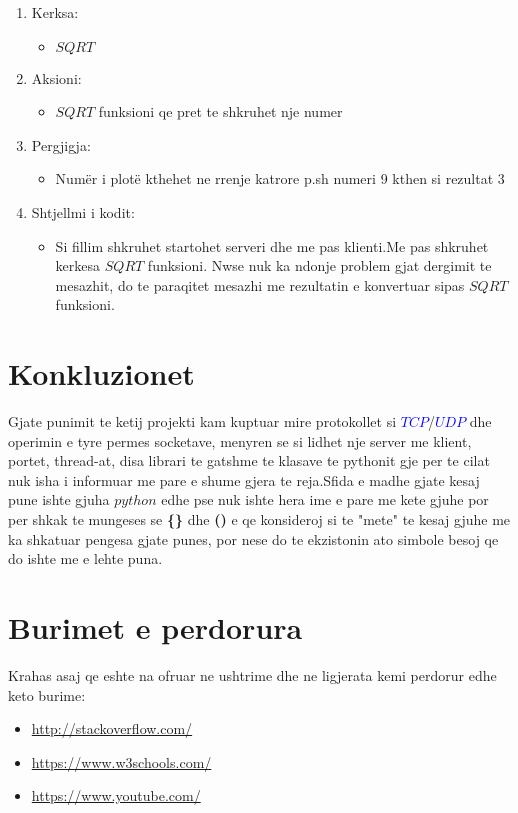 \documentclass[]{article}
\begin{document}
\begin{enumerate}
\item Kerksa:

\begin{itemize}
\item $SQRT$
\end{itemize}
\item Aksioni:
\begin{itemize}
\item $SQRT$ funksioni qe pret te shkruhet nje numer
\end{itemize}
\item Pergjigja:
\begin{itemize}
\item Numër i plotë kthehet ne rrenje katrore p.sh numeri 9 kthen si
rezultat 3
\end{itemize}
\item Shtjellmi i kodit:
\begin{itemize}
\item Si fillim shkruhet startohet serveri dhe me pas klienti.Me pas
shkruhet kerkesa $SQRT$ funksioni. Nwse nuk ka ndonje
problem gjat dergimit te mesazhit,  do te paraqitet
mesazhi me rezultatin e konvertuar sipas $SQRT$ funksioni.
\end{itemize}
\end{enumerate}
\newpage
\section{Konkluzionet}
Gjate punimit te  ketij projekti kam kuptuar mire protokollet si \textcolor{blue}{$TCP$}/\textcolor{blue}{$UDP$} dhe operimin e tyre permes socketave, menyren se si lidhet nje server me klient, portet, thread-at, disa librari te gatshme te klasave te pythonit gje per te cilat nuk isha i informuar me pare e shume gjera te reja.Sfida e madhe gjate kesaj pune ishte gjuha $python$ edhe pse nuk ishte hera ime e pare me kete gjuhe por per shkak te mungeses se \textbf{\{\}} dhe \textbf{()} e qe konsideroj si te "mete"  te kesaj gjuhe  me ka shkatuar pengesa gjate punes, por nese do te ekzistonin ato simbole besoj qe do ishte me e lehte puna.
\vspace*{2cm}
\section{Burimet e perdorura}
Krahas asaj qe eshte na ofruar ne ushtrime dhe ne ligjerata kemi perdorur edhe keto burime:
\begin{itemize}
\item \url{http://stackoverflow.com/}
\item \url{https://www.w3schools.com/}
\item \url{https://www.youtube.com/}

\end{itemize}
\end{document}
